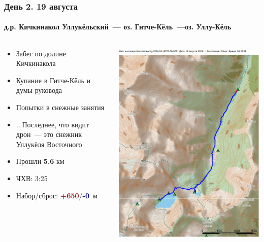 	\begin{frame}
	\frametitle{День 2. 19 августа}
	\framesubtitle{д.р. Кичкинакол Уллукёльский~--- оз. Гитче-Кёль~---оз. Уллу-Кёль} %
	\begin{columns}[c] %
		\begin{column}{0.45\textwidth} %
			\begin{itemize}
				\item Забег по долине Кичкинакола
				\item Купание в Гитче-Кёль и думы руковода
				\item Попытки в снежные занятия
				\item ...Последнее, что видит дрон~--- это снежник Уллукёля Восточного \frownie
				\item Прошли \textbf{5.6} км
				\item ЧХВ: 3:25
				\item Набор/сброс: \textcolor{darkred}{\textbf{+650}}/\textcolor{darkblue}{\textbf{-0}}~м
			\end{itemize}
			
		\end{column}
		\begin{column}{0.5\textwidth} %
			\centering
			\includegraphics[width=\linewidth]{../pics/mini_maps/19}
		\end{column}
	\end{columns}
\end{frame}

